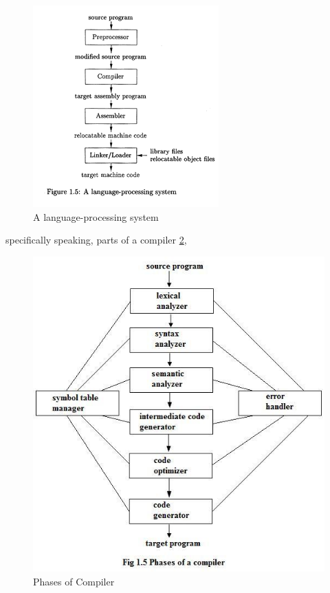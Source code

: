 \documentclass[thesis-solanki.tex]{subfiles}
\begin{document}
\begin{figure}[th]
\centering
\includegraphics[scale = 0.7]{Language_Processing_System.png}
\caption{A language-processing system \cite{Aho:1986:CPT:6448}}
\label{fig:A language-processing system}
\end{figure}

specifically speaking, parts of a compiler \ref{fig:Phases of Compiler},

\begin{figure}[th]
\centering
\includegraphics[scale = 0.7]{Phases_of_compiler.jpg}
\caption{Phases of Compiler \cite{Aho:1986:CPT:6448}}
\label{fig:Phases of Compiler}
\end{figure}
\end{document}
